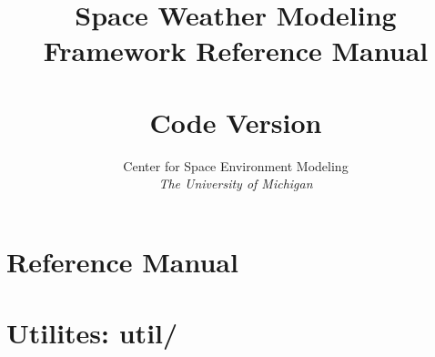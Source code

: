 \documentclass[twoside,10pt]{book}
\title{Space Weather Modeling Framework Reference Manual \\ 
       \hfill \\
       \large Code Version \SWMFVERSION}
\author{Center for Space Environment Modeling\\
       {\it The University of Michigan}}
\begin{document}
\pagestyle{fancy}
\lhead[\fancyplain{}{\bfseries\thepage}]{\fancyplain{}{\bfseries\rightmark}}
\rhead[\fancyplain{}{\bfseries\leftmark}]{\fancyplain{}{\bfseries\thepage}}
\cfoot{}

\maketitle

\tableofcontents

\chapter{Reference Manual}



\chapter{Utilites: util/}


\end{document}
